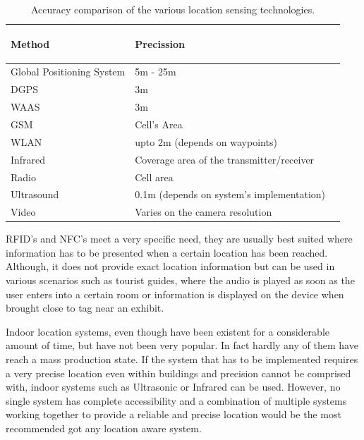 \documentclass[12pt]{report}
\begin{document}
\begin{table}[htdp]

\begin{center}
\begin{tabularx}{\textwidth}{ XXX }
 
  \begin{center}\textbf{Method}\end{center} & \begin{center}\textbf{Precission}\end{center} \\
   \hline
  Global Positioning System  & 5m - 25m  \\
  DGPS   & 3m    \\
  WAAS   & 3m    \\ 
  GSM   & Cell's Area    \\ 
  WLAN    &  upto 2m (depends on waypoints) \\ 
  Infrared    & Coverage area of the transmitter/receiver \\ 
  Radio    &    Cell area \\ 
  Ultrasound    & 0.1m (depends on system's implementation)    \\ 
  Video    & Varies on the camera resolution \\ 
   \hline
  \end{tabularx}

\end{center}
\caption{Accuracy comparison of the various location sensing technologies.}
\label{accuracy comparison}
\end{table}%


RFID's and NFC's meet a very specific need, they are usually best suited where information has to be presented when a certain location has been reached. Although, it does not provide exact location information but can be used in various scenarios such as tourist guides, where the audio is played as soon as the user enters into a certain room or information is displayed on the device when brought close to tag near an exhibit.


Indoor location systems, even though have been existent for a considerable amount of time, but have not been very popular. In fact hardly any of them have reach a mass production state. If the system that has to be implemented requires a very precise location even within buildings and precision cannot be comprised with, indoor systems such as Ultrasonic or Infrared can be used. However, no single system has complete accessibility and a combination of multiple systems working together to provide a reliable and precise location would be the most recommended got any location aware system.
\end{document}
